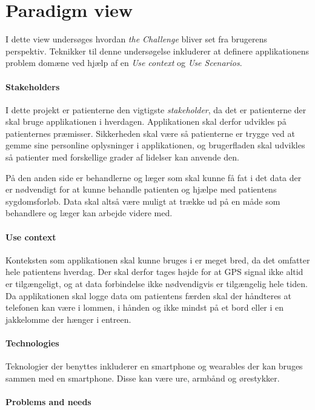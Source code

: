 

\section{Paradigm view}
I dette view undersøges hvordan \textit{the Challenge} bliver set fra brugerens perspektiv.
Teknikker til denne undersøgelse inkluderer at definere applikationens problem domæne ved hjælp af en \textit{Use context} og \textit{Use Scenarios}.

\paragraph{Stakeholders}
I dette projekt er patienterne den vigtigste \textit{stakeholder}, da det er patienterne der skal bruge applikationen i hverdagen.
Applikationen skal derfor udvikles på patienternes præmisser.
Sikkerheden skal være så patienterne er trygge ved at gemme sine personline oplysninger i applikationen, og brugerfladen skal udvikles så patienter med forskellige grader af lidelser kan anvende den.

På den anden side er behandlerne og læger som skal kunne få fat i det data der er nødvendigt for at kunne behandle patienten og hjælpe med patientens sygdomsforløb.
Data skal altså være muligt at trække ud på en måde som behandlere og læger kan arbejde videre med.

\paragraph{Use context}
Konteksten som applikationen skal kunne bruges i er meget bred, da det omfatter hele patientens hverdag.
Der skal derfor tages højde for at GPS signal ikke altid er tilgængeligt, og at data forbindelse ikke nødvendigvis er tilgængelig hele tiden.
Da applikationen skal logge data om patientens færden skal der håndteres at telefonen kan være i lommen, i hånden og ikke mindst på et bord eller i en jakkelomme der hænger i entreen.


\paragraph{Technologies}
Teknologier der benyttes inkluderer en smartphone og wearables der kan bruges sammen med en smartphone.
Disse kan være ure, armbånd og ørestykker.

\paragraph{Problems and needs}

